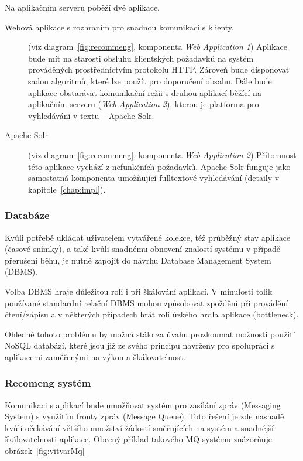 \documentclass[thesis=M,czech]{FITthesis}[2014/05/07]
\begin{document}
Na aplikačním serveru poběží dvě aplikace. 

\begin{description}
	\item[Webová aplikace s rozhraním pro snadnou komunikaci s klienty.]
	(viz diagram~\ref{fig:recommeng}, komponenta \emph{Web Application 1}) Aplikace bude mít na starosti obsluhu klientských požadavků na systém prováděných prostřednictvím protokolu HTTP. Zároveň bude disponovat sadou algoritmů, které lze použít pro doporučení obsahu. Dále bude aplikace obstarávat komunikační režii s druhou aplikací běžící na aplikačním serveru (\emph{Web Application 2}), kterou je platforma pro vyhledávání v textu – Apache Solr.

	\item[Apache Solr]
	(viz diagram~\ref{fig:recommeng}, komponenta \emph{Web Application 2}) Přítomnost této aplikace vychází z nefunkčních požadavků. Apache Solr funguje jako samostatná komponenta umožňující fulltextové vyhledávání (detaily v kapitole~\ref{chap:impl}).
\end{description}

\subsubsection{Databáze}

Kvůli potřebě ukládat uživatelem vytvářené kolekce, též průběžný stav aplikace (časové snímky), a také kvůli snadnému obnovení znalostí systému v případě přerušení běhu, je nutné zapojit do návrhu Database Management System (DBMS).

Volba DBMS hraje důležitou roli i při škálování aplikací. V minulosti tolik používané standardní relační DBMS mohou způsobovat zpoždění při provádění čtení/zápisu a v některých případech hrát roli úzkého hrdla aplikace (bottleneck).

Ohledně tohoto problému by možná stálo za úvahu prozkoumat možnosti použití NoSQL databází, které jsou již ze svého principu navrženy pro spolupráci s aplikacemi zaměřenými na výkon a škálovatelnost.

\subsubsection{Recomeng systém}

Komunikaci s aplikací bude umožňovat systém pro zasílání zpráv (Messaging System) s využitím fronty zpráv (Message Queue). Toto řešení je zde nasnadě kvůli očekávání většího množství žádostí směřujících na systém a snadnější škálovatelnosti aplikace. Obecný příklad takového MQ systému znázorňuje obrázek~\ref{fig:vitvarMq}
\end{document}

